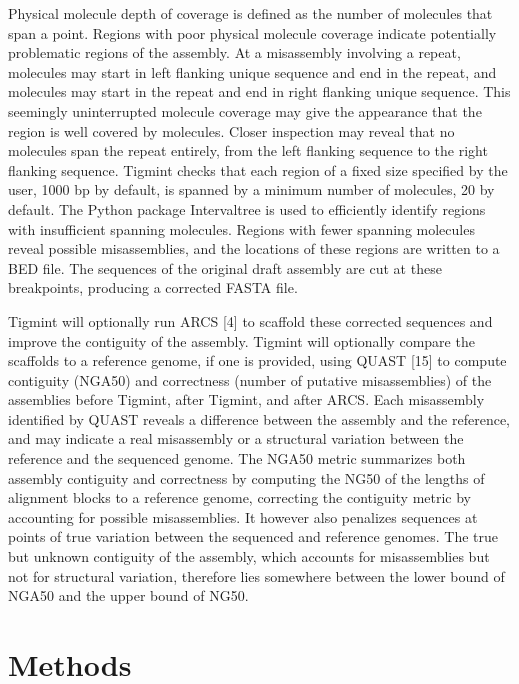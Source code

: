\documentclass{bmcart}
\begin{document}
Physical molecule depth of coverage is defined as the number of molecules that span a point. Regions with poor physical molecule coverage indicate potentially problematic regions of the assembly. At a misassembly involving a repeat, molecules may start in left flanking unique sequence and end in the repeat, and molecules may start in the repeat and end in right flanking unique sequence. This seemingly uninterrupted molecule coverage may give the appearance that the region is well covered by molecules. Closer inspection may reveal that no molecules span the repeat entirely, from the left flanking sequence to the right flanking sequence. Tigmint checks that each region of a fixed size specified by the user, 1000 bp by default, is spanned by a minimum number of molecules, 20 by default. The Python package Intervaltree is used to efficiently identify regions with insufficient spanning molecules. Regions with fewer spanning molecules reveal possible misassemblies, and the locations of these regions are written to a BED file. The sequences of the original draft assembly are cut at these breakpoints, producing a corrected FASTA file.

Tigmint will optionally run ARCS {[}4{]} to scaffold these corrected sequences and improve the contiguity of the assembly. Tigmint will optionally compare the scaffolds to a reference genome, if one is provided, using QUAST {[}15{]} to compute contiguity (NGA50) and correctness (number of putative misassemblies) of the assemblies before Tigmint, after Tigmint, and after ARCS. Each misassembly identified by QUAST reveals a difference between the assembly and the reference, and may indicate a real misassembly or a structural variation between the reference and the sequenced genome. The NGA50 metric summarizes both assembly contiguity and correctness by computing the NG50 of the lengths of alignment blocks to a reference genome, correcting the contiguity metric by accounting for possible misassemblies. It however also penalizes sequences at points of true variation between the sequenced and reference genomes. The true but unknown contiguity of the assembly, which accounts for misassemblies but not for structural variation, therefore lies somewhere between the lower bound of NGA50 and the upper bound of NG50.

\hypertarget{methods}{%
\section*{Methods}\label{methods}}
\end{document}
